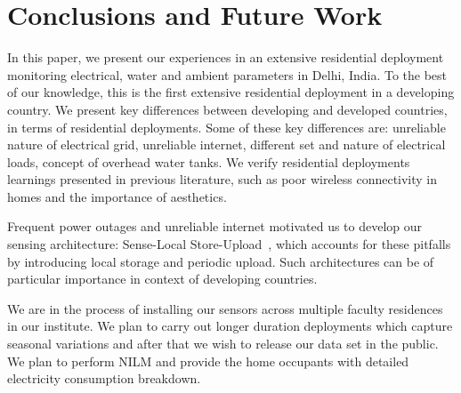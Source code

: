 \documentclass[10pt]{sensys-proc}
\newcommand{\paradigms}{Sense-Local Store-Upload~}
\begin{document}
\section{Conclusions and Future Work}
In this paper, we present our experiences in an extensive residential deployment monitoring electrical, water and ambient parameters in Delhi, India. To the best of our knowledge, this is the first extensive residential deployment in a developing country. We present key differences between developing and developed countries, in terms of residential deployments. Some of these key differences are: unreliable nature of electrical grid, unreliable internet, different set and nature of electrical loads, concept of overhead water tanks. We verify residential deployments learnings presented in previous literature, such as poor wireless connectivity in homes and the importance of aesthetics.

Frequent power outages and unreliable internet motivated us to develop our sensing architecture: \paradigms, which accounts for these pitfalls by introducing local storage and periodic upload. Such architectures can be of particular importance in context of developing countries. 

We are in the process of installing our sensors across multiple faculty residences in our institute. We plan to carry out longer duration deployments which capture seasonal variations and after that we wish to release our data set in the public. 
We plan to perform NILM and provide the home occupants with detailed electricity consumption breakdown.
\balance

 
\end{document}
